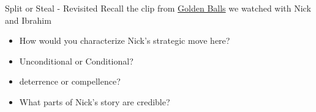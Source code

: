 \begin{frame}{Split or Steal - Revisited}
  Recall the clip from \href{https://youtu.be/S0qjK3TWZE8}{Golden Balls} we watched with Nick and Ibrahim 
  \begin{itemize}
    \item How would you characterize Nick's strategic move here? 
    \item \alert{Unconditional} or \alert{Conditional}?
    \item \alert{deterrence} or \alert{compellence}?
    \item What parts of Nick's story are \alert{credible}?
  \end{itemize}
\end{frame}
